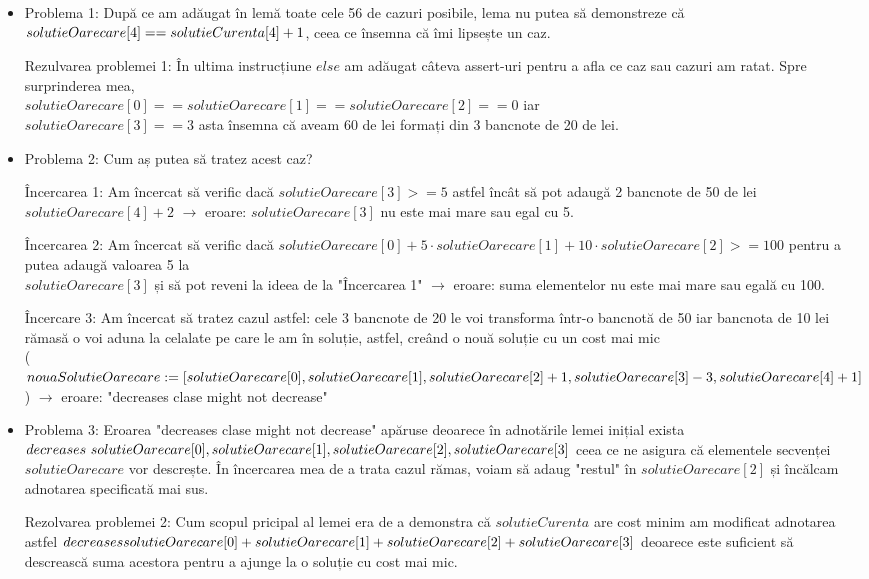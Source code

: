 \begin{itemize}
	\item Problema 1: După ce am adăugat în lemă toate cele 56 de cazuri posibile, lema nu putea să demonstreze că $solutieOarecare[4] == solutieCurenta[4] \\ + 1$, ceea ce însemna că îmi lipsește un caz.\par
	Rezulvarea problemei 1: În ultima instrucțiune $else$ am adăugat câteva assert-uri pentru a afla ce caz sau cazuri am ratat. Spre surprinderea mea,\\ $solutieOarecare[0]==solutieOarecare[1]==solutieOarecare[2]==0$ iar \\ $solutieOarecare[3]==3$  asta însemna că aveam 60 de lei formați din 3 bancnote de 20 de lei.
	\item Problema 2: Cum aș putea să tratez acest caz?\par 
	Încercarea 1: Am încercat să verific dacă $solutieOarecare[3]>=5$ astfel încât să pot adaugă 2 bancnote de 50 de lei $solutieOarecare[4]+2$ $\rightarrow$ eroare: $solutieOarecare[3]$ nu este mai mare sau egal cu 5.\par
	Încercarea 2: Am încercat să verific dacă $ solutieOarecare[0]+ 5 \cdot solutieOarecare[1]+10\cdot solutieOarecare[2] >=100$ pentru a putea adaugă valoarea 5 la \\ $solutieOarecare[3]$ și să pot reveni la ideea de la "Încercarea 1" $\rightarrow$ eroare: suma elementelor nu este mai mare sau egală cu 100. \par
	Încercare 3: Am încercat să tratez cazul astfel: cele 3 bancnote de 20 le voi transforma într-o bancnotă de 50 iar bancnota de 10 lei rămasă o voi aduna la celalate pe care le am în soluție, astfel, creând o nouă soluție cu un cost mai mic \\
	($nouaSolutieOarecare := [solutieOarecare[0], solutieOarecare[1], \\ solutieOarecare[2] + 1, solutieOarecare[3] - 3, solutieOarecare[4] + 1]$) $\rightarrow$ eroare: "decreases clase might not decrease"
	\item Problema 3: Eroarea "decreases clase might not decrease" apăruse deoarece în adnotările lemei inițial exista $decreases \ solutieOarecare[0], solutieOarecare[1],\\ solutieOarecare[2],solutieOarecare[3]$ ceea ce ne asigura că elementele secvenței $solutieOarecare$ vor descrește. În încercarea mea de a trata cazul rămas, voiam să adaug "restul" în $solutieOarecare[2]$ și încălcam adnotarea specificată mai sus.
	\par 
	Rezolvarea problemei 2: Cum scopul pricipal al lemei era de a demonstra că $solutieCurenta$ are cost minim am modificat adnotarea astfel $decreases  \\ solutieOarecare[0] + solutieOarecare[1] + solutieOarecare[2] + solutieOarecare[3]$ deoarece este suficient să descrească suma acestora pentru a ajunge la o soluție cu cost mai mic.
		
\end{itemize}





